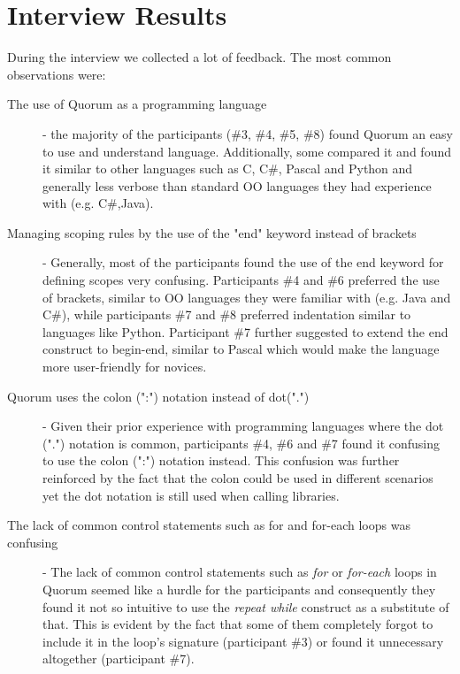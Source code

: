 \section{Interview Results}
During the interview we collected a lot of feedback. The most common observations were:

\begin{description}
\item[The use of Quorum as a programming language] - the majority of the participants (\#3, \#4, \#5, \#8) found Quorum an easy to use and understand language. Additionally, some compared it and found it similar to other languages such as C, C\#, Pascal and Python and generally less verbose than standard OO languages they had experience with (e.g. C\#,Java). 
\item[Managing scoping rules by the use of the "end" keyword instead of brackets] - Generally, most of the participants found the use of the end keyword for defining scopes very confusing. Participants \#4 and \#6 preferred the use of brackets, similar to OO languages they were familiar with (e.g. Java and C\#), while participants \#7 and \#8 preferred indentation similar to languages like Python. Participant \#7 further suggested to extend the end construct to begin-end, similar to Pascal which would make the language more user-friendly for novices. 
\item[Quorum uses the colon (":") notation instead of dot(".")] - Given their prior experience with programming languages where the dot (".") notation is common, participants \#4, \#6 and \#7 found it confusing to use the  colon (":") notation instead. This confusion was further reinforced by the fact that the colon could be used in different scenarios yet the dot notation is still used when calling libraries.
\item[The lack of common control statements such as for and for-each loops was confusing] - The lack of common control statements such as \textit{for} or \textit{for-each} loops in Quorum seemed like a hurdle for the participants and consequently they found it not so intuitive to use the \textit{repeat while} construct as a substitute of that. This is evident by the fact that some of them completely forgot to include it in the loop's signature (participant \#3) or found it unnecessary altogether (participant \#7).
\end{description}